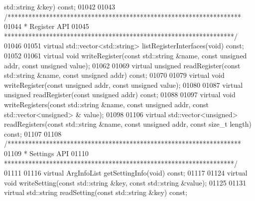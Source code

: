 \begin{DoxyCode}
      std::string &key) \textcolor{keyword}{const};
01042 
01043     \textcolor{comment}{/*******************************************************************}
01044 \textcolor{comment}{     * Register API}
01045 \textcolor{comment}{     ******************************************************************/}
01046 
01051     \textcolor{keyword}{virtual} std::vector<std::string> listRegisterInterfaces(\textcolor{keywordtype}{void}) \textcolor{keyword}{const};
01052 
01061     \textcolor{keyword}{virtual} \textcolor{keywordtype}{void} writeRegister(\textcolor{keyword}{const} std::string &name, \textcolor{keyword}{const} \textcolor{keywordtype}{unsigned} addr, \textcolor{keyword}{const} \textcolor{keywordtype}{unsigned} value);
01062 
01069     \textcolor{keyword}{virtual} \textcolor{keywordtype}{unsigned} readRegister(\textcolor{keyword}{const} std::string &name, \textcolor{keyword}{const} \textcolor{keywordtype}{unsigned} addr) \textcolor{keyword}{const};
01070 
01079     \textcolor{keyword}{virtual} \textcolor{keywordtype}{void} writeRegister(\textcolor{keyword}{const} \textcolor{keywordtype}{unsigned} addr, \textcolor{keyword}{const} \textcolor{keywordtype}{unsigned} value);
01080 
01087     \textcolor{keyword}{virtual} \textcolor{keywordtype}{unsigned} readRegister(\textcolor{keyword}{const} \textcolor{keywordtype}{unsigned} addr) \textcolor{keyword}{const};
01088 
01097     \textcolor{keyword}{virtual} \textcolor{keywordtype}{void} writeRegisters(\textcolor{keyword}{const} std::string &name, \textcolor{keyword}{const} \textcolor{keywordtype}{unsigned} addr, \textcolor{keyword}{const} std::vector<unsigned> &
      value);
01098 
01106     \textcolor{keyword}{virtual} std::vector<unsigned> readRegisters(\textcolor{keyword}{const} std::string &name, \textcolor{keyword}{const} \textcolor{keywordtype}{unsigned} addr, \textcolor{keyword}{const} \textcolor{keywordtype}{size\_t} 
      length) \textcolor{keyword}{const};
01107 
01108     \textcolor{comment}{/*******************************************************************}
01109 \textcolor{comment}{     * Settings API}
01110 \textcolor{comment}{     ******************************************************************/}
01111 
01116     \textcolor{keyword}{virtual} ArgInfoList getSettingInfo(\textcolor{keywordtype}{void}) \textcolor{keyword}{const};
01117 
01124     \textcolor{keyword}{virtual} \textcolor{keywordtype}{void} writeSetting(\textcolor{keyword}{const} std::string &key, \textcolor{keyword}{const} std::string &value);
01125 
01131     \textcolor{keyword}{virtual} std::string readSetting(\textcolor{keyword}{const} std::string &key) \textcolor{keyword}{const};

\end{DoxyCode}
